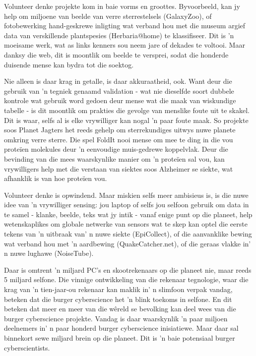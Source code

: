 Volunteer denke projekte kom in baie vorms en groottes. Byvoorbeeld, kan jy help om miljoene van beelde van verre sterrestelsels (GalaxyZoo), of fotobewerking hand-geskrewe inligting wat verband hou met die museum argief data van verskillende plantspesies (Herbaria@home) te klassifiseer. Dit is 'n moeisame werk, wat as links kenners sou neem jare of dekades te voltooi. Maar danksy die web, dit is moontlik om beelde te versprei, sodat die honderde duisende mense kan bydra tot die soektog. \par
Nie alleen is daar krag in getalle, is daar akkuraatheid, ook. Want deur die gebruik van 'n tegniek genaamd validation - wat nie dieselfde soort dubbele kontrole wat gebruik word gedoen deur mense wat die maak van wiskundige tabelle - is dit moontlik om prakties die gevolge van menslike foute uit te skakel. Dit is waar, selfs al is elke vrywilliger kan nogal 'n paar foute maak. So projekte soos Planet Jagters het reeds gehelp om sterrekundiges uitwys nuwe planete omkring verre sterre. Die spel FoldIt nooi mense om mee te ding in die vou proteïen molekules deur 'n eenvoudige muis-gedrewe koppelvlak. Deur die bevinding van die mees waarskynlike manier om 'n proteïen sal vou, kan vrywilligers help met die verstaan van siektes soos Alzheimer se siekte, wat afhanklik is van hoe proteïen vou. \par
Volunteer denke is opwindend. Maar miskien selfs meer ambisieus is, is die nuwe idee van 'n vrywilliger sensing: jou laptop of selfs jou selfoon gebruik om data in te samel - klanke, beelde, teks wat jy intik - vanaf enige punt op die planeet, help wetenskaplikes om globale netwerke van sensors wat te skep kan optel die eerste tekens van 'n uitbraak van' n nuwe siekte (EpiCollect), of die aanvanklike bewing wat verband hou met 'n aardbewing (QuakeCatcher.net), of die geraas vlakke in' n nuwe lughawe (NoiseTube). \par

Daar is omtrent 'n miljard PC's en skootrekenaars op die planeet nie, maar reeds 5 miljard selfone. Die vinnige ontwikkeling van die rekenaar tegnologie, waar die krag van 'n tien-jaar-ou rekenaar kan maklik in' n slimfoon verpak vandag, beteken dat die burger cyberscience het 'n blink toekoms in selfone. En dit beteken dat meer en meer van die wêreld se bevolking kan deel wees van die burger cyberscience projekte. Vandag is daar waarskynlik 'n paar miljoen deelnemers in' n paar honderd burger cyberscience inisiatiewe. Maar daar sal binnekort sewe miljard brein op die planeet. Dit is 'n baie potensiaal burger cyberscientists. \par

